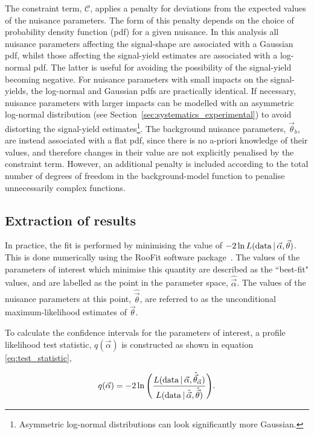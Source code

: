 The constraint term, $\mathcal{C}$, applies a penalty for deviations from the expected values of the nuisance parameters. The form of this penalty depends on the choice of probability density function (pdf) for a given nuisance. In this analysis all nuisance parameters affecting the signal-shape are associated with a Gaussian pdf, whilst those affecting the signal-yield estimates are associated with a log-normal pdf. The latter is useful for avoiding the possibility of the signal-yield becoming negative. For nuisance parameters with small impacts on the signal-yields, the log-normal and Gaussian pdfs are practically identical. If necessary, nuisance parameters with larger impacts can be modelled with an asymmetric log-normal distribution (see Section~\ref{sec:systematics_experimental}) to avoid distorting the signal-yield estimates\footnote{Asymmetric log-normal distributions can look significantly more Gaussian.}. The background nuisance parameters, $\vec{\theta}_b$, are instead associated with a flat pdf, since there is no a-priori knowledge of their values, and therefore changes in their value are not explicitly penalised by the constraint term. However, an additional penalty is included according to the total number of degrees of freedom in the background-model function to penalise unnecessarily complex functions.

\subsection{Extraction of results}\label{sec:results_extraction}
In practice, the fit is performed by minimising the value of $-2 \ln L({\rm{data}}\,|\,\vec{\alpha},\vec{\theta})$. This is done numerically using the RooFit software package~\cite{Verkerke:2003ir}. The values of the parameters of interest which minimise this quantity are described as the ``best-fit" values, and are labelled as the point in the parameter space, $\hat{\vec{\alpha}}$. The values of the nuisance parameters at this point, $\hat{\vec{\theta}}$, are referred to as the unconditional maximum-likelihood estimates of $\vec{\theta}$. 

To calculate the confidence intervals for the parameters of interest, a profile likelihood test statistic, $q(\vec{\alpha})$ is constructed as shown in equation \ref{eq:test_statistic},

\begin{equation}\label{eq:test_statistic}
    q(\vec{\alpha}) = -2 \ln \Bigg( \frac{L({\rm{data}}\,|\,\vec{\alpha},\hat{\vec{\theta}}_{\vec{\alpha}})}{L({\rm{data}}\,|\,\hat{\vec{\alpha}},\hat{\vec{\theta}})} \Bigg).
\end{equation}

